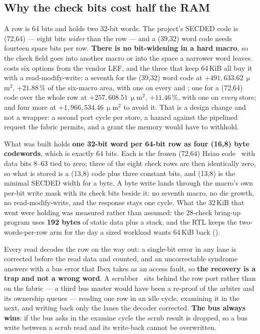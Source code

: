 \subsection{Why the check bits cost half the RAM}

A  row is 64 bits and holds two 32-bit words. The project's
SECDED code is (72,64) --- eight bits \emph{wider} than the row --- and a
(39,32) word code needs fourteen spare bits per row. \textbf{There is no
bit-widening in a hard macro}, so the check field goes into another macro
or into the space a narrower word leaves.  costs six
options from the vendor LEF, and the three that keep 64\,KiB all buy it
with a read-modify-write: a seventh  for the (39,32) word
code at $+491{,}633.62\,\upmu$m$^2$, $+21.88$\,\% of the six-macro area,
with one on every  and ; one  for a
(72,64) code over the whole row at $+257{,}608.51\,\upmu$m$^2$,
$+11.46$\,\%, with one on \emph{every} store; and four more
 at $+1{,}966{,}534.46\,\upmu$m$^2$ to avoid it. That is a design
change and not a wrapper: a second port cycle per store, a hazard against
the pipelined request the fabric permits, and a grant the memory would
have to withhold.

What was built holds \textbf{one 32-bit word per 64-bit row as four
(16,8) byte codewords}, which is exactly 64 bits. Each is the frozen
(72,64) Hsiao code~\cite{hsiao1970} with data bits 8--63 tied to zero; three of the eight
check rows are then identically zero, so what is stored is a (13,8) code
plus three constant bits, and (13,8) is the minimal SECDED width for a
byte. A byte write lands through the macro's own per-bit write mask with
its check bits beside it: no seventh macro, no die growth, no
read-modify-write, and the response stays one cycle.  What the 32\,KiB that went were holding was measured rather than assumed:
the 28-check bring-up program uses \textbf{192 bytes} of static data plus
a stack, and the RTL keeps the two-words-per-row arm for the day a sized
workload wants 64\,KiB back ().

Every read decodes the row on the way out: a single-bit error in any lane
is corrected before the read data and counted, and an uncorrectable
syndrome answers with a bus error that Ibex takes as an access fault, so
\textbf{the recovery is a trap and not a wrong word}. A scrubber~\cite{saleh1990} sits
behind the row port rather than on the fabric --- a third bus master would
have been a re-proof of the arbiter and its ownership queues --- reading
one row in an idle cycle, examining it in the next, and writing back only
the lanes the decoder corrected. \textbf{The bus always wins}: if the bus
asks in the examine cycle the scrub result is dropped, so a bus write
between a scrub read and its write-back cannot be overwritten.

